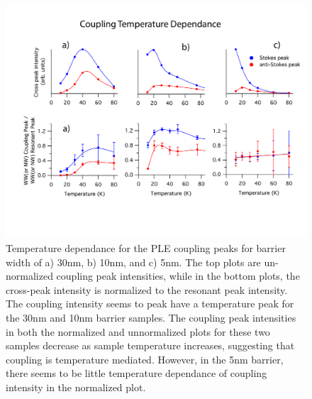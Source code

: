 \begin{figure}
\centering
\includegraphics[width = \textwidth]{Layoutple2.pdf}
\caption{ \doublespacing Temperature dependance for the PLE coupling peaks for barrier width of a) 30nm, b) 10nm, and c) 5nm. The top plots are un-normalized coupling peak intensities, while in the bottom plots, the cross-peak intensity is normalized to the resonant peak intensity. The coupling intensity seems to peak have a temperature peak for the 30nm and 10nm barrier samples. The coupling peak intensities in both the normalized and unnormalized plots for these two samples decrease as sample temperature increases, suggesting that coupling is temperature mediated. However, in the 5nm barrier, there seems to be little temperature dependance of coupling intensity in the normalized plot.} 
\label{xpkintensity}
\end{figure}
